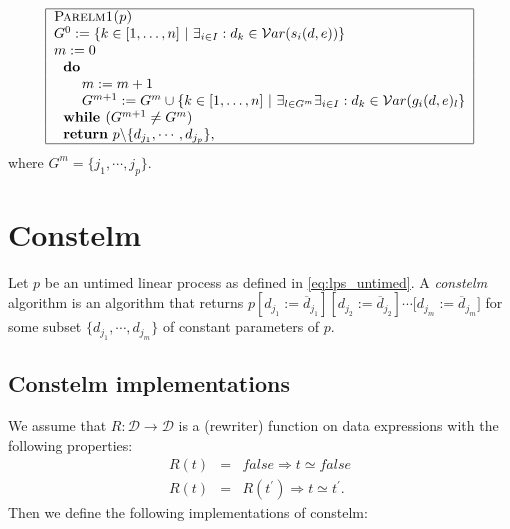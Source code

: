 \documentclass{article}
\begin{document}
\[
\begin{tabular}{|l|}
\hline
\textsc{Parelm1(}$p$\textsc{)} \\
$G^{0}:=\{k\in \lbrack 1,\ldots ,n]\ |\ \exists _{i\in I}:d_{k}\in \mathcal{V%
}ar(s_{i}(d,e))\}$ \\
$m:=0$ \\
$\text{\textbf{do}}$ \\
$\qquad m:=m+1$ \\
$\qquad G^{m+1}:=G^{m}\cup \{k\in \lbrack 1,\ldots ,n]\ |\ \exists _{l\in
G^{m}}\exists _{i\in I}:d_{k}\in \mathcal{V}ar(g_{i}(d,e)_{l}\}$ \\
$\text{\textbf{while }}(G^{m+1}\neq G^{m})$ \\
$\text{\textbf{return} }p\backslash \{d_{j_{1}},\cdots ,d_{j_{p}}\},$ \\
\hline
\end{tabular}%
\]%
where $G^{m}=\{j_{1},\cdots ,j_{p}\}$.\bigskip

\section{Constelm}

Let $p$ be an untimed linear process as defined in \ref{eq:lps_untimed}. A
\emph{constelm} algorithm is an algorithm that returns $p[d_{j_{1}}:=%
\overline{d}_{j_{1}}][d_{j_{2}}:=\overline{d}_{j_{2}}]\cdots \lbrack
d_{j_{m}}:=\overline{d}_{j_{m}}]$ for some subset $\{d_{j_{1}},\cdots
,d_{j_{m}}\}$ of constant parameters of $p$.

\subsection{Constelm implementations}

We assume that $R:\mathcal{D\rightarrow D}$ is a (rewriter) function on data
expressions with the following properties:%
\begin{eqnarray}
R(t) &=&false\Rightarrow t\simeq false  \nonumber \\
R(t) &=&R(t^{\prime })\Rightarrow t\simeq t^{\prime }\text{.}
\end{eqnarray}%
Then we define the following implementations of constelm:
\end{document}
